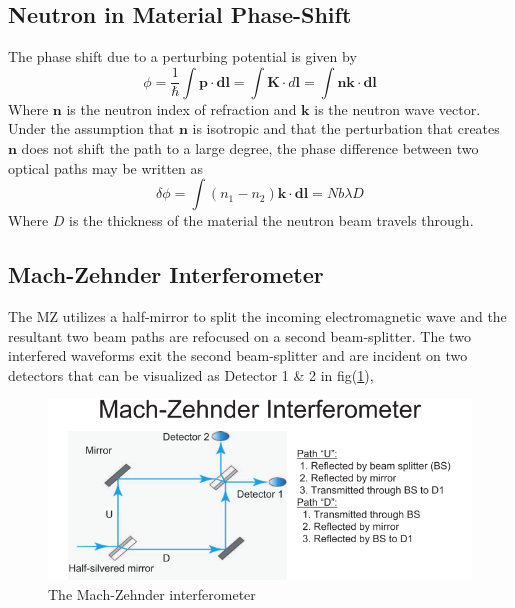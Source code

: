 \subsection{Neutron in Material Phase-Shift}
The phase shift due to a perturbing potential is given by \cite{green_2}
\begin{equation}
\phi = \frac{1}{\hbar}\int  \mathbf{p}\cdot \mathbf{dl} = \int \mathbf{K}\cdot d\mathbf{l}= \int \mathbf{nk}\cdot \mathbf{dl}
\label{eq:phase_shift}
\end{equation}
Where $\mathbf{n}$ is the neutron index of refraction and $\mathbf{k}$ is the neutron wave vector. Under the assumption that $\mathbf{n}$ is isotropic and that the perturbation that creates $\mathbf{n}$ does not shift the path to a large degree, the phase difference between two optical paths may be written as
\begin{equation}
\delta\phi = \int (n_1-n_2)\mathbf{k}\cdot \mathbf{dl} = Nb\lambda D
\label{eq:phase_shift_full}
\end{equation}
Where $D$ is the thickness of the material the neutron beam travels through.  

\subsection{Mach-Zehnder Interferometer}

The MZ utilizes a half-mirror to split the incoming electromagnetic wave and the resultant two beam paths are refocused on a second beam-splitter. The two interfered waveforms exit the second beam-splitter and are incident on two detectors that can be visualized as Detector 1 \& 2 in fig(\ref{mach-zehnder}),

\begin{figure}[ht!]
\centering
\includegraphics[scale=1.0]{Figures/mach-zender.png}
\caption{The Mach-Zehnder interferometer}
\label{mach-zehnder}
\end{figure}

